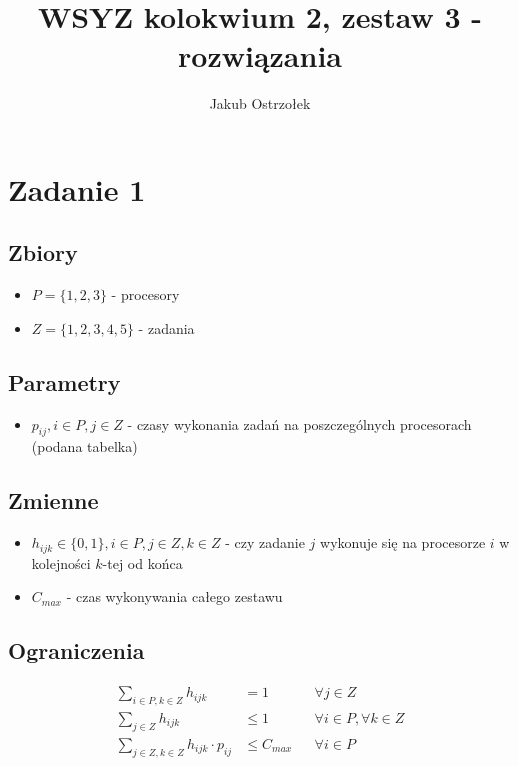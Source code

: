 \documentclass{report}
\title{WSYZ kolokwium 2, zestaw 3 - rozwiązania}
\author{Jakub Ostrzołek}
\begin{document}
\maketitle

\section*{Zadanie 1}
\subsection*{Zbiory}
\begin{itemize}
    \item $P = \{1, 2, 3\}$ - procesory
    \item $Z = \{1, 2, 3, 4, 5\}$ - zadania
\end{itemize}

\subsection*{Parametry}
\begin{itemize}
    \item $p_{ij}, i \in P, j \in Z$ - czasy wykonania zadań
          na poszczególnych procesorach (podana tabelka)
\end{itemize}

\subsection*{Zmienne}
\begin{itemize}
    \item $h_{ijk} \in \{0, 1\}, i \in P, j \in Z, k \in Z$ -
          czy zadanie $j$ wykonuje się na procesorze $i$ w
          kolejności $k$-tej od końca
    \item $C_{max}$ - czas wykonywania całego zestawu
\end{itemize}

\subsection*{Ograniczenia}
\begin{align*}
    \sum_{i \in P, k \in Z} h_{ijk}              & = 1         &  & \forall j \in Z                  \\
    \sum_{j \in Z} h_{ijk}                       & \le 1       &  & \forall i \in P, \forall k \in Z \\
    \sum_{j \in Z, k \in Z} h_{ijk} \cdot p_{ij} & \le C_{max} &  & \forall i \in P                  \\
\end{align*}
\end{document}
